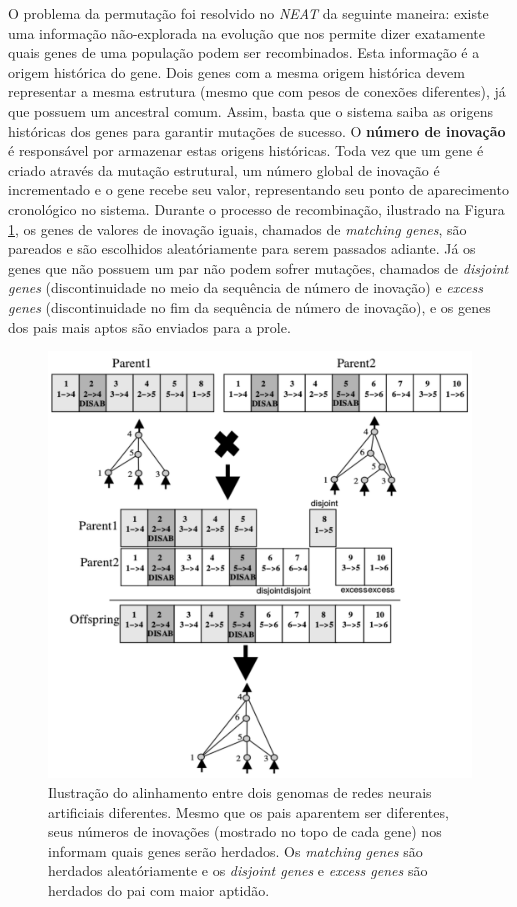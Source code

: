 O problema da permutação foi resolvido no \textit{NEAT} da seguinte maneira:
existe uma informação não-explorada na evolução que nos permite dizer exatamente
quais genes de uma população podem ser recombinados. Esta informação é a origem
histórica do gene. Dois genes com a mesma origem histórica devem representar a
mesma estrutura (mesmo que com pesos de conexões diferentes), já que possuem um
ancestral comum. Assim, basta que o sistema saiba as origens históricas dos
genes para garantir mutações de sucesso.  O \textbf{número de inovação} é
responsável por armazenar estas origens históricas.  Toda vez que um gene é
criado através da mutação estrutural, um número global de inovação é
incrementado e o gene recebe seu valor, representando seu ponto de aparecimento
cronológico no sistema.  Durante o processo de recombinação, ilustrado na Figura
\ref{fig:neat-innovation-matchup}, os genes de valores de inovação iguais,
chamados de \textit{matching genes}, são pareados e são escolhidos
aleatóriamente para serem passados adiante. Já os genes que não possuem um par
não podem sofrer mutações, chamados de \textit{disjoint genes} (discontinuidade
no meio da sequência de número de inovação) e \textit{excess genes}
(discontinuidade no fim da sequência de número de inovação), e os genes dos pais
mais aptos são enviados para a prole.

\begin{figure}[H]
\centering
\includegraphics[width=\textwidth]{fig/neat-crossover-example.pdf}
\caption{Ilustração do alinhamento entre dois genomas de redes neurais
artificiais diferentes. Mesmo que os pais aparentem ser diferentes, seus números
de inovações (mostrado no topo de cada gene) nos informam quais genes serão
herdados. Os \textit{matching genes} são herdados aleatóriamente e os
\textit{disjoint genes} e \textit{excess genes} são herdados do pai com maior
aptidão.}
\label{fig:neat-innovation-matchup}
\end{figure}

